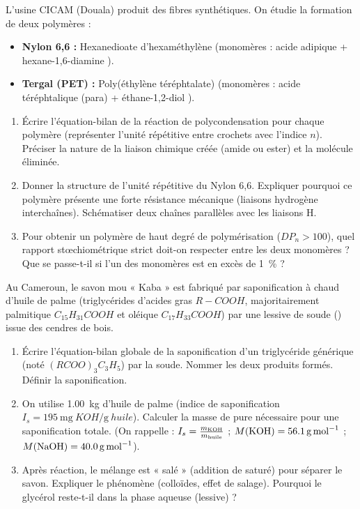 \documentclass[11pt]{article}
\begin{document}
\begin{exercice}
L'usine CICAM (Douala) produit des fibres synthétiques. On étudie la formation de deux polymères :
\begin{itemize}
    \item \textbf{Nylon 6,6 :} Hexanedioate d'hexaméthylène (monomères : acide adipique  + hexane-1,6-diamine ).
    \item \textbf{Tergal (PET) :} Poly(éthylène téréphtalate) (monomères : acide téréphtalique  (para) + éthane-1,2-diol ).
\end{itemize}
\begin{enumerate}
    \item Écrire l'équation-bilan de la réaction de polycondensation pour chaque polymère (représenter l'unité répétitive entre crochets avec l'indice $n$). Préciser la nature de la liaison chimique créée (amide ou ester) et la molécule éliminée.
    \item Donner la structure de l'unité répétitive du Nylon 6,6. Expliquer pourquoi ce polymère présente une forte résistance mécanique (liaisons hydrogène interchaînes). Schématiser deux chaînes parallèles avec les liaisons H.
    \item Pour obtenir un polymère de haut degré de polymérisation ($DP_n > 100$), quel rapport stœchiométrique strict doit-on respecter entre les deux monomères ? Que se passe-t-il si l'un des monomères est en excès de \SI{1}{\%} ?
\end{enumerate}
\end{exercice}

\begin{exercice}
Au Cameroun, le savon mou « Kaba » est fabriqué par saponification à chaud d'huile de palme (triglycérides d'acides gras $R-COOH$, majoritairement palmitique $C_{15}H_{31}COOH$ et oléique $C_{17}H_{33}COOH$) par une lessive de soude () issue des cendres de bois.
\begin{enumerate}
    \item Écrire l'équation-bilan globale de la saponification d'un triglycéride générique (noté $(RCOO)_3C_3H_5$) par la soude. Nommer les deux produits formés. Définir la saponification.
    \item On utilise \SI{1,00}{\kilo\gram} d'huile de palme (indice de saponification $I_s = \SI{195}{\milli\gram~KOH\per\gram~huile}$). Calculer la masse de  pure nécessaire pour une saponification totale. (On rappelle : $I_s = \frac{m_{\ce{KOH}}}{m_{\text{huile}}}$ ; $M(\ce{KOH})=\SI{56,1}{\gram\per\mol}$ ; $M(\ce{NaOH})=\SI{40,0}{\gram\per\mol}$).
    \item Après réaction, le mélange est « salé » (addition de  saturé) pour séparer le savon. Expliquer le phénomène (colloïdes, effet de salage). Pourquoi le glycérol reste-t-il dans la phase aqueuse (lessive) ?
\end{enumerate}
\end{exercice}
\end{document}
